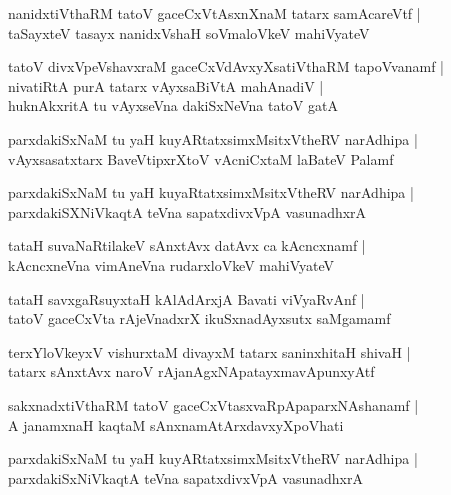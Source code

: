 \documentclass[twoside,12pt,openright]{book}
\newcounter{shloka}[chapter]
\begin{document}
\begin{shloka}
nanidxtiVthaRM tatoV gaceCxVtAsxnXnaM tatarx samAcareVtf |\\
taSayxteV tasayx nanidxVshaH soVmaloVkeV mahiVyateV
\end{shloka}

\begin{shloka}
tatoV divxVpeVshavxraM gaceCxVdAvxyXsatiVthaRM tapoVvanamf |\\
nivatiRtA purA tatarx vAyxsaBiVtA mahAnadiV |\\
huknAkxritA tu vAyxseVna dakiSxNeVna tatoV gatA
\end{shloka}

\begin{shloka}
parxdakiSxNaM tu yaH kuyARtatxsimxMsitxVtheRV narAdhipa |\\
vAyxsasatxtarx BaveVtipxrXtoV vAcniCxtaM laBateV Palamf
\end{shloka}

\begin{shloka}
parxdakiSxNaM tu yaH kuyaRtatxsimxMsitxVtheRV narAdhipa |\\
parxdakiSXNiVkaqtA teVna sapatxdivxVpA vasunadhxrA 
\end{shloka}

\begin{shloka}
tataH suvaNaRtilakeV sAnxtAvx datAvx ca kAcncxnamf |\\
kAcncxneVna vimAneVna rudarxloVkeV mahiVyateV 
\end{shloka}

\begin{shloka}
tataH savxgaRsuyxtaH kAlAdArxjA Bavati viVyaRvAnf |\\
tatoV gaceCxVta rAjeVnadxrX ikuSxnadAyxsutx saMgamamf 
\end{shloka}

\begin{shloka}
terxYloVkeyxV vishurxtaM divayxM tatarx saninxhitaH shivaH |\\
tatarx sAnxtAvx naroV rAjanAgxNApatayxmavApunxyAtf
\end{shloka}

\begin{shloka}
sakxnadxtiVthaRM tatoV gaceCxVtasxvaRpApaparxNAshanamf |\\
A janamxnaH kaqtaM sAnxnamAtArxdavxyXpoVhati 
\end{shloka}

\begin{shloka}
parxdakiSxNaM tu yaH kuyARtatxsimxMsitxVtheRV narAdhipa |\\
parxdakiSxNiVkaqtA teVna sapatxdivxVpA vasunadhxrA 
\end{shloka}
\end{document}
